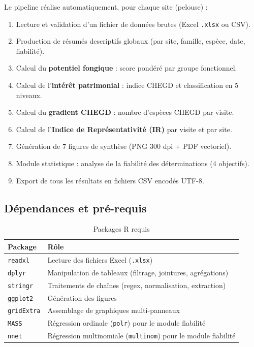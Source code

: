 \documentclass[11pt,a4paper]{article}
\begin{document}
Le pipeline réalise automatiquement, pour chaque site (pelouse) :

\begin{enumerate}[label=\arabic*.]
  \item Lecture et validation d'un fichier de données brutes (Excel \texttt{.xlsx} ou CSV).
  \item Production de résumés descriptifs globaux (par site, famille, espèce, date, fiabilité).
  \item Calcul du \textbf{potentiel fongique} : score pondéré par groupe fonctionnel.
  \item Calcul de l'\textbf{intérêt patrimonial} : indice CHEGD et classification en 5 niveaux.
  \item Calcul du \textbf{gradient CHEGD} : nombre d'espèces CHEGD par visite.
  \item Calcul de l'\textbf{Indice de Représentativité (IR)} par visite et par site.
  \item Génération de 7 figures de synthèse (PNG 300 dpi + PDF vectoriel).
  \item Module statistique : analyse de la fiabilité des déterminations (4 objectifs).
  \item Export de tous les résultats en fichiers CSV encodés UTF-8.
\end{enumerate}

\subsection{Dépendances et pré-requis}

\begin{table}[htbp]
  \centering
  \caption{Packages R requis}
  \begin{tabularx}{\textwidth}{lX}
    \toprule
    \textbf{Package} & \textbf{Rôle} \\
    \midrule
    \texttt{readxl}    & Lecture des fichiers Excel (\texttt{.xlsx}) \\
    \texttt{dplyr}     & Manipulation de tableaux (filtrage, jointures, agrégations) \\
    \texttt{stringr}   & Traitements de chaînes (regex, normalisation, extraction) \\
    \texttt{ggplot2}   & Génération des figures \\
    \texttt{gridExtra} & Assemblage de graphiques multi-panneaux \\
    \texttt{MASS}      & Régression ordinale (\texttt{polr}) pour le module fiabilité \\
    \texttt{nnet}      & Régression multinomiale (\texttt{multinom}) pour le module fiabilité \\
    \bottomrule
  \end{tabularx}
\end{table}
\end{document}
